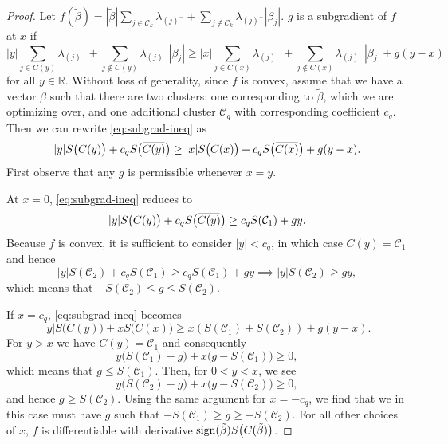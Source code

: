 \begin{proof}
  Let \(f(\tilde\beta) = |\tilde\beta|\sum_{j \in \mathcal{C}_k}\lambda_{(j)^-} + \sum_{j \notin \mathcal{C}_k} \lambda_{(j)^-}|\beta_j|\).
  \(g\) is a subgradient of \(f\) at \(x\) if
  \begin{equation}
    \label{eq:subgrad-ineq}
    |y|\sum_{j \in C(y)}\lambda_{(j)^-} + \sum_{j \notin C(y)}\lambda_{(j)^-}|\beta_j|
    \geq |x|\sum_{j \in C(x)} \lambda_{(j)^-} + \sum_{j \notin C(x)}\lambda_{(j)^-}|\beta_j| + g(y - x)
  \end{equation}
  for all \(y \in \mathbb{R}\).
  Without loss of generality, since \(f\) is convex, assume that we have
  a vector \(\beta\) such that there are two clusters: one corresponding
  to \(\tilde\beta\), which we are optimizing over, and
  one additional cluster \(\mathcal{C}_q\) with corresponding
  coefficient \(c_q\).
  Then we can rewrite \eqref{eq:subgrad-ineq} as
  \[
    |y|S\big(C(y)\big) + c_q S\big(\widebar{C(y)}\big) \geq
    |x| S\big(C(x)\big) + c_q S\big(\widebar{C(x)}\big) + g(y - x).
  \]
  First observe that any \(g\) is permissible whenever \(x = y\).

  At \(x = 0\), \eqref{eq:subgrad-ineq} reduces to
  \[
    |y|S\big(C(y)\big) + c_q S\big(\widebar{C(y)}\big)
    \geq c_q S(\mathcal{C}_1) + gy.
  \]
  Because \(f\) is convex, it is sufficient to consider \(|y| < c_q\),
  in which case \(C(y) = \mathcal{C}_1\) and hence
  \begin{equation}
      |y|S(\mathcal{C}_2) + c_q S(\mathcal{C}_1) \geq c_q S(\mathcal{C}_1) + gy \implies
      |y|S(\mathcal{C}_2) \geq gy,
  \end{equation}
  which means that \(-S(\mathcal{C}_2) \leq g \leq S(\mathcal{C}_2)\).

  If \(x = c_q\), \eqref{eq:subgrad-ineq} becomes
  \[
    |y|S\big(C(y)\big) + x S\big(C(x)\big) \geq x(S(\mathcal{C}_1) + S(\mathcal{C}_2)) + g(y - x).
  \]
  For \(y > x\) we have \(C(y) = \mathcal{C}_1\) and consequently
  \[
    y\big(S(\mathcal{C}_1) - g\big) + x\big(g - S(\mathcal{C}_1)\big) \geq 0,
  \]
  which means that \(g \leq S(\mathcal{C}_1)\).
  Then, for \(0 < y < x\), we see
  \[
    y\big(S(\mathcal{C}_2) - g\big) + x(g - S(\mathcal{C}_2)\big) \geq 0,
  \]
  and hence \(g \geq S(\mathcal{C}_2)\).
  Using the same argument for \(x = -c_q\), we find that we in this case
  must have \(g\) such that
  \(-S(\mathcal{C}_1) \geq g \geq - S(\mathcal{C}_2)\).
  For all other choices of \(x\), \(f\) is differentiable with
  derivative \(\operatorname{sign}(\tilde\beta)S\big(C(\tilde\beta)\big)\).
\end{proof}

